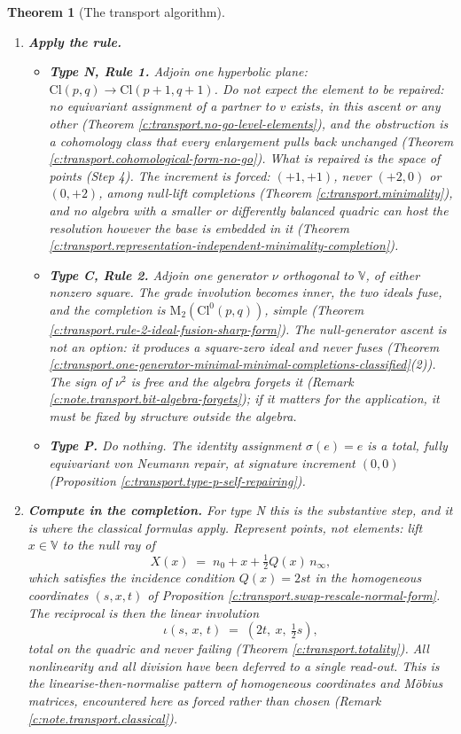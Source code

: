 \documentclass[11pt]{article}
\newtheorem{theorem}{Theorem}[section]
\theoremstyle{definition}
\theoremstyle{plain}
\providecommand{\Cl}{}\renewcommand{\Cl}{\mathrm{Cl}}
\providecommand{\Mat}{}\renewcommand{\Mat}{\mathrm{M}}
\providecommand{\nInf}{}\renewcommand{\nInf}{n_\infty}
\providecommand{\nO}{}\renewcommand{\nO}{n_0}
\begin{document}
\begin{theorem}[The transport algorithm]
\begin{enumerate}
\item[\textbf{Step 3.}] \textbf{Apply the rule.}
  \begin{itemize}
  \item \textbf{Type N, Rule 1.} Adjoin one hyperbolic plane: $\Cl(p,q) \to \Cl(p{+}1,q{+}1)$. Do not expect the element to be repaired: no equivariant assignment of a partner to $v$ exists, in this ascent or any other (Theorem \ref{c:transport.no-go-level-elements}), and the obstruction is a cohomology class that every enlargement pulls back unchanged (Theorem \ref{c:transport.cohomological-form-no-go}). What is repaired is the space of points (Step 4). The increment is forced: $(+1,+1)$, never $(+2,0)$ or $(0,+2)$, among null-lift completions (Theorem \ref{c:transport.minimality}), and no algebra with a smaller or differently balanced quadric can host the resolution however the base is embedded in it (Theorem \ref{c:transport.representation-independent-minimality-completion}).
  \item \textbf{Type C, Rule 2.} Adjoin one generator $\nu$ orthogonal to $\mathbb{V}$, of either nonzero square. The grade involution becomes inner, the two ideals fuse, and the completion is $\Mat_2(\Cl^0(p,q))$, simple (Theorem \ref{c:transport.rule-2-ideal-fusion-sharp-form}). The null-generator ascent is not an option: it produces a square-zero ideal and never fuses (Theorem \ref{c:transport.one-generator-minimal-minimal-completions-classified}(2)). The sign of $\nu^2$ is free and the algebra forgets it (Remark \ref{c:note.transport.bit-algebra-forgets}); if it matters for the application, it must be fixed by structure outside the algebra.
  \item \textbf{Type P.} Do nothing. The identity assignment $\sigma(e) = e$ is a total, fully equivariant von Neumann repair, at signature increment $(0,0)$ (Proposition \ref{c:transport.type-p-self-repairing}).
  \end{itemize}

\item[\textbf{Step 4.}] \textbf{Compute in the completion.} For type N this is the substantive step, and it is where the classical formulas apply. Represent points, not elements: lift $x \in \mathbb{V}$ to the null ray of
  \[
  X(x) \;=\; \nO + x + \tfrac12 Q(x)\,\nInf ,
  \]
  which satisfies the incidence condition $Q(x) = 2st$ in the homogeneous coordinates $(s,x,t)$ of Proposition \ref{c:transport.swap-rescale-normal-form}. The reciprocal is then the linear involution
  \[
  \iota(s,\,x,\,t) \;=\; (2t,\ x,\ \tfrac12 s),
  \]
  total on the quadric and never failing (Theorem \ref{c:transport.totality}). All nonlinearity and all division have been deferred to a single read-out. This is the linearise-then-normalise pattern of homogeneous coordinates and M\"obius matrices, encountered here as forced rather than chosen (Remark \ref{c:note.transport.classical}).


\end{enumerate}
\end{theorem}
\end{document}
